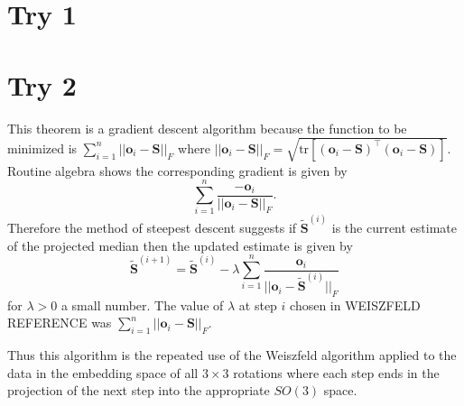 \documentclass[12pt]{article}
\begin{document}
\section{Try 1}



\section{Try 2}
This theorem is a gradient descent algorithm because the function to be minimized is $\sum_{i=1}^n||\bm o_i-\bm S||_F$ where $||\bm o_i-\bm S||_F=\sqrt{\text{tr}[(\bm o_i-\bm S)^\top(\bm o_i-\bm S)]}$.  Routine algebra shows the corresponding gradient is given by
\[
\sum_{i=1}^n\frac{-\bm o_i}{||\bm o_i-\bm S||_F}.
\]
Therefore the method of steepest descent suggests if $\widetilde{\bm S}^{(i)}$ is the current estimate of the projected median then the updated estimate is given by
\[
\widetilde{\bm S}^{(i+1)}=\widetilde{\bm S}^{(i)}-\lambda\sum_{i=1}^n\frac{\bm o_i}{||\bm o_i -\widetilde{\bm{S}}^{(i)}||_F}
\]
for $\lambda>0$ a small number.  The value of $\lambda$ at step $i$ chosen in WEISZFELD REFERENCE was $\sum_{i=1}^n||\bm o_i-\bm S||_F$.  

Thus this algorithm is the repeated use of the Weiszfeld algorithm applied to the data in the embedding space of all $3\times 3$ rotations where each step ends in the projection of the next step into the appropriate $SO(3)$ space.
\end{document}
